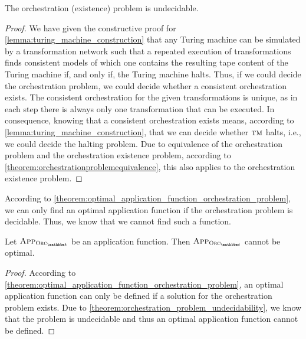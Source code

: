 \begin{theorem} \label{theorem:orchestration_problem_undecidability}
    The orchestration (existence) problem is undecidable.
\end{theorem}
\begin{proof}
    We have given the constructive proof for \autoref{lemma:turing_machine_construction} that any Turing machine can be simulated by a transformation network such that a repeated execution of transformations finds consistent models of which one contains the resulting tape content of the Turing machine if, and only if, the Turing machine halts.
    Thus, if we could decide the orchestration problem, we could decide whether a consistent orchestration exists. 
    The consistent orchestration for the given transformations is unique, as in each step there is always only one transformation that can be executed.
    In consequence, knowing that a consistent orchestration exists means, according to \autoref{lemma:turing_machine_construction}, that we can decide whether $\textsc{tm}$ halts, i.e., we could decide the halting problem.
    Due to equivalence of the orchestration problem and the orchestration existence problem, according to \autoref{theorem:orchestrationproblemequivalence}, this also applies to the orchestration existence problem.
\end{proof}

According to \autoref{theorem:optimal_application_function_orchestration_problem}, we can only find an optimal application function if the orchestration problem is decidable.
Thus, we know that we cannot find such a function.

\begin{corollary}
    \label{corollary:nooptimalapplication}
    Let $\appfunction{\orcfunction{\transformationset{T}}}$ be an application function. Then $\appfunction{\orcfunction{\transformationset{T}}}$ cannot be optimal.
\end{corollary}
\begin{proof}
    According to \autoref{theorem:optimal_application_function_orchestration_problem}, an optimal application function can only be defined if a solution for the orchestration problem exists.
    Due to \autoref{theorem:orchestration_problem_undecidability}, we know that the problem is undecidable and thus an optimal application function cannot be defined.
\end{proof}

